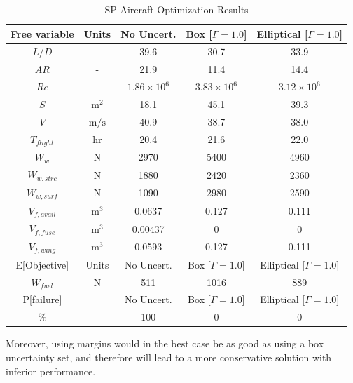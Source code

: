 \begin{table}[!h]
\begin{center}
\caption{\label{tab:results} SP Aircraft Optimization Results}
\begin{tabular}{c c c c c}
\hline
Free variable & Units & No Uncert. & Box [$\Gamma = 1.0$] & Elliptical [$\Gamma = 1.0$] \\
\hline
$L/D$ & - & 39.6 & 30.7 & 33.9 \\
$AR$ & - & 21.9 & 11.4 & 14.4 \\
$Re$ & - & $1.86 \times 10^6$ & $3.83\times 10^6$ & $3.12 \times 10^6$ \\
$S$ & $\mathrm{m^2}$ & 18.1 & 45.1 & 39.3 \\
$V$ & $\mathrm{m/s}$ & 40.9 & 38.7 & 38.0 \\
$T_{flight}$ & $\mathrm{hr}$ & 20.4 & 21.6 & 22.0 \\
$W_w$ & $\mathrm{N}$ & 2970 & 5400 & 4960 \\
$W_{w,strc}$ & $\mathrm{N}$ & 1880 & 2420 & 2360 \\
$W_{w,surf}$ & $\mathrm{N}$ & 1090 & 2980 & 2590 \\
$V_{f,avail}$ & $\mathrm{m^3}$ & 0.0637 & 0.127 & 0.111 \\
$V_{f,fuse}$ & $\mathrm{m^3}$ & 0.00437 & 0 & 0 \\
$V_{f,wing}$ & $\mathrm{m^3}$ & 0.0593 & 0.127 & 0.111 \\
\hline
E[Objective] & Units & No Uncert. & Box [$\Gamma = 1.0$] & Elliptical [$\Gamma = 1.0$] \\
\hline
$W_{fuel}$ & $\mathrm{N}$ & 511 & 1016 & 889 \\
\hline
P[failure] & & No Uncert. & Box [$\Gamma = 1.0$] & Elliptical [$\Gamma = 1.0$] \\
\hline
\% & & 100 & 0 & 0\\
\hline
\end{tabular}
\end{center}
\end{table}


Moreover, using margins would in the best case be as good as using a box uncertainty set, and therefore will lead
to a more conservative solution with inferior performance.

